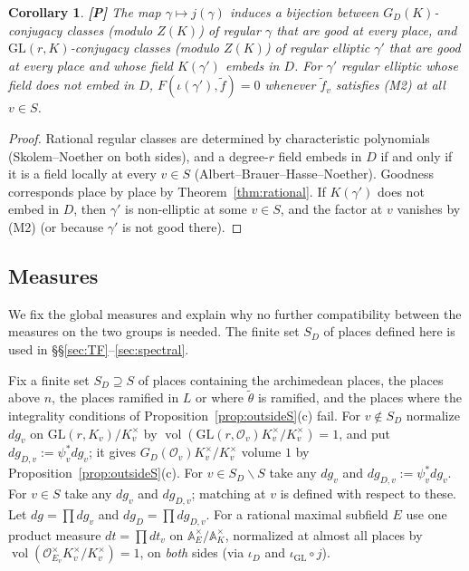 \documentclass[12pt]{article}
\newcommand{\A}{\mathbb{A}}
\newcommand{\cO}{\mathcal{O}}
\newcommand{\vol}{\operatorname{vol}}
\newcommand{\GL}{\mathrm{GL}}
\newcommand{\iD}{\iota_D}
\newcommand{\iG}{\iota_{\GL}}
\newcommand{\Pv}{\textbf{[P]}}
\theoremstyle{plain}
\newtheorem{corollary}[theorem]{Corollary}
\theoremstyle{definition}
\begin{document}
\begin{corollary}\label{cor:rationalbij}\Pv
The map $\gamma\mapsto j(\gamma)$ induces a bijection between $G_D(K)$-conjugacy classes (modulo $Z(K)$) of regular $\gamma$ that are good at every place, and $\GL(r,K)$-conjugacy classes (modulo $Z(K)$) of regular elliptic $\gamma'$ that are good at every place and whose field $K(\gamma')$ embeds in $D$. For $\gamma'$ regular elliptic whose field does not embed in $D$, $F(\iota(\gamma'),\tilde f)=0$ whenever $\tilde f_v$ satisfies (M2) at all $v\in S$.
\end{corollary}
\begin{proof}
Rational regular classes are determined by characteristic polynomials (Skolem--Noether on both sides), and a degree-$r$ field embeds in $D$ if and only if it is a field locally at every $v\in S$ (Albert--Brauer--Hasse--Noether). Goodness corresponds place by place by Theorem~\ref{thm:rational}. If $K(\gamma')$ does not embed in $D$, then $\gamma'$ is non-elliptic at some $v\in S$, and the factor at $v$ vanishes by (M2) (or because $\gamma'$ is not good there).
\end{proof}

\subsection{Measures}\label{subsec:measures}
We fix the global measures and explain why no further compatibility between the measures on the two groups is needed. The finite set $S_D$ of places defined here is used in \S\S\ref{sec:TF}--\ref{sec:spectral}.

Fix a finite set $S_D\supseteq S$ of places containing the archimedean places, the places above $n$, the places ramified in $L$ or where $\tilde\theta$ is ramified, and the places where the integrality conditions of Proposition~\ref{prop:outsideS}(c) fail. For $v\notin S_D$ normalize $dg_v$ on $\GL(r,K_v)/K_v^\times$ by $\vol(\GL(r,\cO_v)K_v^\times/K_v^\times)=1$, and put $dg_{D,v}:=\psi_v^*dg_v$; it gives $G_D(\cO_v)K_v^\times/K_v^\times$ volume $1$ by Proposition~\ref{prop:outsideS}(c). For $v\in S_D\smallsetminus S$ take any $dg_v$ and $dg_{D,v}:=\psi_v^*dg_v$. For $v\in S$ take any $dg_v$ and $dg_{D,v}$; matching at $v$ is defined with respect to these. Let $dg=\prod dg_v$ and $dg_D=\prod dg_{D,v}$. For a rational maximal subfield $E$ use one product measure $dt=\prod dt_v$ on $\A_E^\times/\A_K^\times$, normalized at almost all places by $\vol(\cO_{E_v}^\times K_v^\times/K_v^\times)=1$, on \emph{both} sides (via $\iD$ and $\iG\circ j$).
\end{document}

